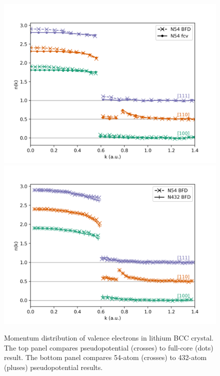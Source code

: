 \documentclass[aps,prb,showpacs,preprintnumbers,amsmath,amssymb,superscriptaddress,twocolumn]{revtex4}
\begin{document}
\begin{figure}[h]
\includegraphics[width=\linewidth]{figures/li57_fc-fcv-dir}
\includegraphics[width=\linewidth]{figures/li52f_bfd-crystal-n54-n432-nk}
\caption{Momentum distribution of valence electrons in lithium BCC crystal. The top panel compares pseudopotential (crosses) to full-core (dots) result.
The bottom panel compares 54-atom (crosses) to 432-atom (pluses) pseudopotential results.\label{fig:nk}}
\end{figure}
\end{document}
